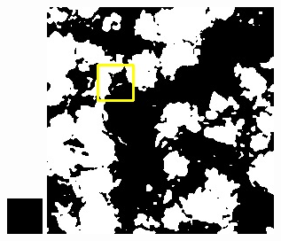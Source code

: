 \documentclass[10pt]{ctexart}
\begin{document}
\begin{figure}[H]
{{\begin{minipage}[b]{0.15\linewidth}
            \includegraphics[width=1\linewidth]{../log/spoon2/cut/tmp_cut_LC81321192014054LGN00_03055_unet.jpg}\vspace{4pt}
            \includegraphics[width=1\linewidth]{../log/spoon2/cut/LC80350192014190LGN00_06561_unet.jpg}\vspace{4pt}

\end{minipage}}}
\end{figure}
\end{document}
